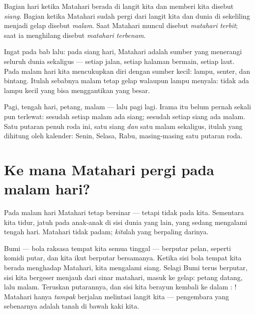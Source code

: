 \begin{definition}\label{def:g1:day-and-night:daynight}
Bagian hari ketika Matahari berada di langit kita dan memberi kita
 disebut \emph{siang}. Bagian ketika Matahari sudah
pergi dari langit kita dan dunia di sekeliling menjadi gelap disebut
\emph{malam}. Saat Matahari muncul disebut \emph{matahari
terbit}; saat ia menghilang disebut
\emph{matahari terbenam}.
\end{definition}

\begin{remark}\label{rem:g1:day-and-night:lamp}
Ingat  pada bab lalu: pada siang hari, Matahari adalah
sumber yang menerangi seluruh dunia sekaligus --- setiap jalan, setiap
halaman bermain, setiap laut. Pada malam hari kita mencukupkan diri
dengan sumber kecil: lampu, senter, dan bintang. Itulah sebabnya malam
tetap gelap walaupun lampu menyala: tidak ada lampu kecil yang bisa
menggantikan yang besar.
\end{remark}

\begin{example}\label{ex:g1:day-and-night:rhythm}
Pagi, tengah hari, petang, malam --- lalu pagi lagi. Irama itu belum
pernah sekali pun terlewat: sesudah setiap malam ada siang; sesudah
setiap siang ada malam. Satu putaran penuh roda ini, satu siang
\emph{dan} satu malam sekaligus, itulah yang dihitung oleh kalender:
Senin, Selasa, Rabu, masing-masing satu putaran roda.
\end{example}

\section{Ke mana Matahari pergi pada malam hari?}

Pada malam hari Matahari tetap bersinar --- tetapi tidak pada kita.
Sementara kita tidur,  jatuh pada anak-anak di sisi dunia
yang lain, yang sedang mengalami tengah hari. Matahari tidak padam;
\emph{kita}lah yang berpaling darinya.

\begin{example}\label{ex:g1:day-and-night:spinning}
Bumi --- bola raksasa tempat kita semua tinggal --- berputar pelan,
seperti komidi putar, dan kita ikut berputar bersamanya. Ketika sisi
bola tempat kita berada menghadap Matahari, kita mengalami siang.
Selagi Bumi terus berputar, sisi kita bergeser menjauh dari sinar
matahari, masuk ke gelap: petang datang, lalu malam. Teruskan
putarannya, dan sisi kita berayun kembali ke dalam : ! Matahari hanya \emph{tampak} berjalan melintasi langit kita
--- pengembara yang sebenarnya adalah tanah di bawah kaki kita.
\end{example}

